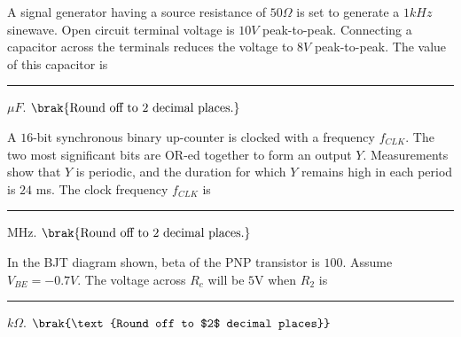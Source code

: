 {{\begin{figure}[H]
\label{fig:my_label}
\end{figure}
}
\item{
A signal generator having a source resistance of $50\Omega$ is set to generate a $1kHz$ sinewave. Open circuit terminal voltage is $10V$ peak-to-peak. Connecting a capacitor across the terminals reduces the voltage to $8V$ peak-to-peak. The value of this capacitor is \rule{2cm}{0.15mm}$\mu F$. $\brak{\text{Round off to 2 decimal places.}}$\\
}
\item{
A $16$-bit synchronous binary up-counter is clocked with a frequency $f_{CLK}$. The two most significant bits are OR-ed together to form an output $Y$. Measurements show that $Y$ is periodic, and the duration for which $Y$ remains high in each period is $24$ ms. The clock frequency $f_{CLK}$ is \rule{2cm}{0.15mm}MHz. $\brak{\text{Round off to 2 decimal places.}}$\\
}
\item{
In the BJT diagram shown, beta of the PNP transistor is $100$. Assume $V_{BE}=-0.7V$. The voltage across $R_c$ will be $5$V when $R_2$ is \rule{2cm}{0.15mm}$k\Omega$. $\brak{\text{Round off to $2$ decimal places}}$
\begin{figure}[H]
\centering
{}%


\end{figure}}}
